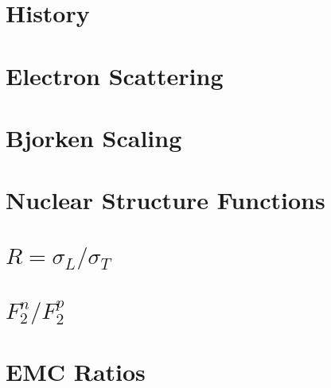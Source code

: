 
\section{History}


\section{Electron Scattering}


\section{Bjorken Scaling}


\section{Nuclear Structure Functions}


\section{$R=\sigma_L/\sigma_T$}


\section{$F_2^n/F_2^p$}


\section{EMC Ratios}


